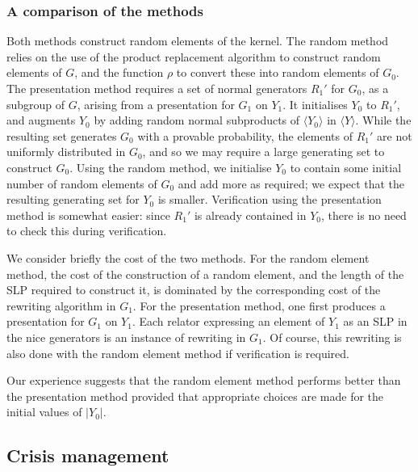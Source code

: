 \documentclass[12pt,twoside,reqno,psamsfonts]{amsproc}
\numberwithin{equation}{section}
\numberwithin{figure}{section}
\newcounter{algorithm}
\theoremstyle{plain}
\theoremstyle{definition}
\theoremstyle{remark}
\providecommand{\abs}[1]{\left\lvert #1 \right\rvert}
\begin{document}
\subsubsection{A comparison of the methods}
Both methods construct random elements of the kernel.  The random method
relies on the use of the product replacement algorithm to construct random 
elements of $G$, and the function $\rho$ to convert these into
random elements of $G_0$.  
The presentation method requires a set of normal generators $R_1'$ 
for $G_0$, as a subgroup of $G$, arising from a presentation 
for $G_1$ on $Y_1$.  It initialises $Y_0$ to $R_1'$, 
and augments $Y_0$ by adding 
random normal subproducts \cite{MR1235795} 
of $\langle Y_0\rangle$ in $\langle Y\rangle$.  
While the resulting set generates $G_0$ with a provable probability, 
the elements of $R_1'$ are not uniformly distributed in $G_0$, 
and so we may require a large generating set to construct $G_0$.
Using the random method, we initialise $Y_0$ to contain 
some initial number of random elements of $G_0$
and add more as required; 
we expect that the resulting generating set for $Y_0$ is smaller. 
Verification using the presentation method is 
somewhat easier: since $R_1'$ is already contained in $Y_0$,
there is no need to check this during verification.

We consider briefly the cost of the two methods.
For the random element method, the cost of the construction of 
a random element, and the length of the 
SLP required to construct it, is dominated by the corresponding cost of 
the rewriting algorithm in $G_1$.
For the presentation method, one first produces a
presentation for $G_1$ on $Y_1$.
Each relator expressing 
an element of $Y_1$ as an SLP in the nice generators is 
an instance of rewriting in $G_1$. Of course, this rewriting 
is also done with the
random element method if verification is required.

Our experience suggests that the random element method performs
better than the presentation method provided that appropriate 
choices are made for the initial values of $\abs{Y_0}$.

\subsection{Crisis management}
\label{section:crisis-management}
\end{document}
